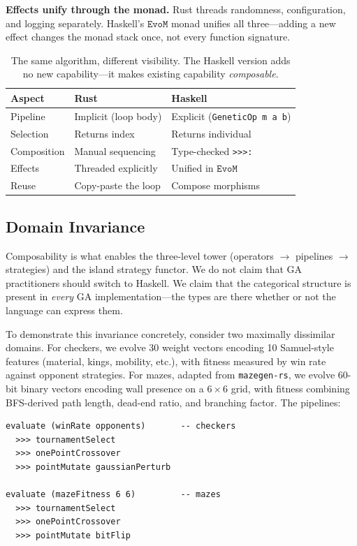 \documentclass[dvipsnames,format=sigconf,anonymous=false,review=false]{acmart}
\newcommand{\EvoM}{\texttt{EvoM}}
\begin{document}
\textbf{Effects unify through the monad.} Rust threads randomness, configuration, and logging separately. Haskell's $\EvoM$ monad unifies all three---adding a new effect changes the monad stack once, not every function signature.

\begin{table}[ht]
\centering
\caption{The same algorithm, different visibility. The Haskell version adds no new capability---it makes existing capability \emph{composable}.}
\label{tab:rust-haskell}
\small
\begin{tabular}{@{}lll@{}}
\toprule
\textbf{Aspect} & \textbf{Rust} & \textbf{Haskell} \\
\midrule
Pipeline    & Implicit (loop body)      & Explicit (\texttt{GeneticOp m a b}) \\
Selection   & Returns index             & Returns individual \\
Composition & Manual sequencing         & Type-checked \texttt{>{>}{>}:} \\
Effects     & Threaded explicitly       & Unified in $\EvoM$ \\
Reuse       & Copy-paste the loop       & Compose morphisms \\
\bottomrule
\end{tabular}
\end{table}

\subsection{Domain Invariance}

Composability is what enables the three-level tower (operators $\to$ pipelines $\to$ strategies) and the island strategy functor. We do not claim that GA practitioners should switch to Haskell. We claim that the categorical structure is present in \emph{every} GA implementation---the types are there whether or not the language can express them.

To demonstrate this invariance concretely, consider two maximally dissimilar domains. For checkers, we evolve 30 weight vectors encoding 10 Samuel-style features (material, kings, mobility, etc.), with fitness measured by win rate against opponent strategies. For mazes, adapted from \texttt{mazegen-rs}, we evolve 60-bit binary vectors encoding wall presence on a $6 \times 6$ grid, with fitness combining BFS-derived path length, dead-end ratio, and branching factor. The pipelines:

\begin{lstlisting}[style=plainstyle]
evaluate (winRate opponents)       -- checkers
  >>> tournamentSelect
  >>> onePointCrossover
  >>> pointMutate gaussianPerturb

evaluate (mazeFitness 6 6)         -- mazes
  >>> tournamentSelect
  >>> onePointCrossover
  >>> pointMutate bitFlip
\end{lstlisting}
\end{document}
